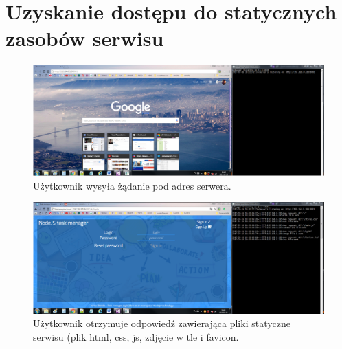 \documentclass[12pt]{report}
\begin{document}
\section{Uzyskanie dostępu do statycznych zasobów serwisu}
\begin{figure}[!hb]
\centering
\includegraphics[width=\textwidth,height=\textheight,keepaspectratio]{11.png}
\captionsetup{labelformat=empty}
\caption[]{Użytkownik wysyła żądanie pod adres serwera.}
\end{figure}
\begin{figure}[!hb]
\centering
\includegraphics[width=\textwidth,height=\textheight,keepaspectratio]{12.png}
\captionsetup{labelformat=empty}
\caption[]{Użytkownik otrzymuje odpowiedź zawierająca pliki statyczne serwisu (plik html, css, js, zdjęcie w tle i favicon.}
\end{figure}
\end{document}
